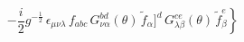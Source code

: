 \begin{equation}\label{eq:fvar}
\left. -\frac{i}{2} g^{-\frac{1}{2}} \,  \epsilon_{\mu\nu\lambda}
\, f_{abc}\, G_{\nu\alpha}^{bd}(\theta)\,{\tilde f}_\alpha]^d
\, G_{\lambda\beta}^{ce}(\theta) \, {\tilde f}_\beta^e \right\}
\end{equation}

